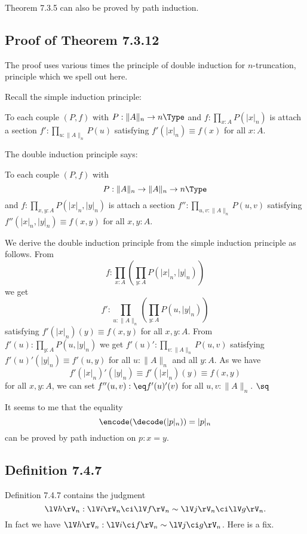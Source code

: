 \documentclass[12pt]{article}
\begin{document}
Theorem 7.3.5 can also be proved by path induction.


\subsection{Proof of Theorem 7.3.12}

The proof uses various times the principle of double induction for $n$-truncation, principle which we spell out here.

Recall the simple induction principle:

To each couple $(P,f)$ with $P:\lVert A\rVert_n\to n\Type$ and $f:\prod_{x:A}P(\lvert x\rvert_n)$ is attach a section $f':\prod_{u:\lVert A\rVert_n}P(u)$ satisfying $f'(\lvert x\rvert_n)\equiv f(x)$ for all $x:A$.

The double induction principle says:

To each couple $(P,f)$ with $$P:\lVert A\rVert_n\to\lVert A\rVert_n\to n\Type$$ and $f:\prod_{x,y:A}P(\lvert x\rvert_n,\lvert y\rvert_n)$ is attach a section $f'':\prod_{u,v:\lVert A\rVert_n}P(u,v)$ satisfying $f''(\lvert x\rvert_n,\lvert y\rvert_n)\equiv f(x,y)$ for all $x,y:A$.

We derive the double induction principle from the simple induction principle as follows. From 
$$
f:\prod_{x:A}\left(\prod_{y:A}P(\lvert x\rvert_n,\lvert y\rvert_n)\right)
$$ 
we get 
$$
f':\prod_{u:\lVert A\rVert_n}\left(\prod_{y:A}P(u,\lvert y\rvert_n)\right)
$$ 
satisfying $f'(\lvert x\rvert_n)(y)\equiv f(x,y)$ for all $x,y:A$. From $f'(u):\prod_{y:A}P(u,\lvert y\rvert_n)$ we get $f'(u)':\prod_{v:\lVert A\rVert_n}P(u,v)$ satisfying $f'(u)'(\lvert y\rvert_n)\equiv f'(u,y)$ for all $u:\lVert A\rVert_n$ and all $y:A$. As we have 
$$
f'(\lvert x\rvert_n)'(\lvert y\rvert_n)\equiv f'(\lvert x\rvert_n)(y)\equiv f(x,y) 
$$ 
for all $x,y:A$, we can set $f''(u,v):\eq f'(u)'(v)$ for all $u,v:\lVert A\rVert_n$. $\sq$

It seems to me that the equality 
$$
\encode(\decode(\lvert p\rvert_n))=\lvert p\rvert_n
$$ 
can be proved by path induction on $p:x=y$.


\subsection{Definition 7.4.7}\label{747}

Definition 7.4.7 contains the judgment 
$$
\lV h\rV_n:\lV i\rV_n\ci\lV f\rV_n\sim\lV j\rV_n\ci\lV g\rV_n.
$$ 
In fact we have $\lV h\rV_n:\lV i\ci f\rV_n\sim\lV j\ci g\rV_n$. Here is a fix. 
\end{document}
